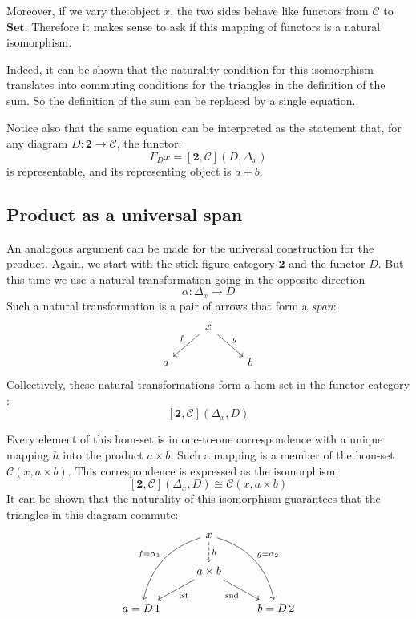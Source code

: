 \documentclass[DaoFP]{subfiles}
\begin{document}
Moreover, if we vary the object $x$, the two sides behave like functors from  $\mathcal{C}$ to $\mathbf{Set}$. Therefore it makes sense to ask if this mapping of functors is a natural isomorphism. 

Indeed, it can be shown that the naturality condition for this isomorphism translates into commuting conditions for the triangles in the definition of the sum. So the definition of the sum can be replaced by a single equation.

Notice also that the same equation can be interpreted as the statement that, for any diagram $D \colon \mathbf{2} \to \mathcal{C}$, the functor:
\[ F_D x = [\mathbf{2}, \mathcal{C}](D, \Delta_x) \]
is representable, and its representing object is $a + b$.

\subsection{Product as a universal span}

An analogous argument can be made for the universal construction for the product. Again, we start with the stick-figure category $\mathbf{2}$ and the functor $D$. But this time we use a natural transformation going in the opposite direction
\[ \alpha \colon \Delta_x \to D \]
Such a natural transformation is a pair of arrows that form a \emph{span}:
\[
 \begin{tikzcd}
 &x
 \arrow[dl, "f"']
 \arrow[dr, "g"]
 \\
 a
 && b
  \end{tikzcd}
\]
Collectively, these natural transformations form a hom-set in the functor category :
\[[\mathbf{2}, \mathcal{C}](\Delta_x, D) \]

Every element of this hom-set is in one-to-one correspondence with a unique mapping $h$ into the product $a \times b$. Such a mapping is a member of the hom-set $\mathcal{C}(x, a \times b)$. This correspondence is expressed as the isomorphism:
\[ [\mathbf{2}, \mathcal{C}](\Delta_x, D)  \cong \mathcal{C}(x, a \times b) \]
It can be shown that the naturality of this isomorphism guarantees that the triangles in this diagram commute:
\[
 \begin{tikzcd}
 & x
\arrow[d, dashed, "h"]
 \arrow[ddl, bend right, "f = \alpha_1"']
 \arrow[ddr, bend left, "g = \alpha_2"]
\\
&a \times b
 \arrow[dl,  "\text{fst}"]
  \arrow[dr,   "\text{snd}"']
\\
a = D\, 1 && b = D \, 2
 \end{tikzcd}
\]
\end{document}
